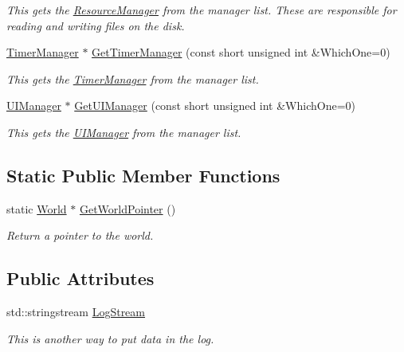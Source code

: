 \begin{DoxyCompactItemize}
\begin{DoxyCompactList}\small\item\em This gets the \hyperlink{classphys_1_1ResourceManager}{ResourceManager} from the manager list. These are responsible for reading and writing files on the disk. \item\end{DoxyCompactList}\item 
\hyperlink{classphys_1_1TimerManager}{TimerManager} $\ast$ \hyperlink{classphys_1_1World_a8e25bc6da5864d303b246224901af852}{GetTimerManager} (const short unsigned int \&WhichOne=0)
\begin{DoxyCompactList}\small\item\em This gets the \hyperlink{classphys_1_1TimerManager}{TimerManager} from the manager list. \item\end{DoxyCompactList}\item 
\hyperlink{classphys_1_1UIManager}{UIManager} $\ast$ \hyperlink{classphys_1_1World_ab7888bf9286df602490c30df6382fde9}{GetUIManager} (const short unsigned int \&WhichOne=0)
\begin{DoxyCompactList}\small\item\em This gets the \hyperlink{classphys_1_1UIManager}{UIManager} from the manager list. \item\end{DoxyCompactList}\end{DoxyCompactItemize}
\subsection*{Static Public Member Functions}
\begin{DoxyCompactItemize}
\item 
static \hyperlink{classphys_1_1World}{World} $\ast$ \hyperlink{classphys_1_1World_ac7b8470a75353497bf8f85a8d3cd24e4}{GetWorldPointer} ()
\begin{DoxyCompactList}\small\item\em Return a pointer to the world. \item\end{DoxyCompactList}\end{DoxyCompactItemize}
\subsection*{Public Attributes}
\begin{DoxyCompactItemize}
\item 
std::stringstream \hyperlink{classphys_1_1World_a6d8b325a077afc924afb70c259ec0299}{LogStream}
\begin{DoxyCompactList}\small\item\em This is another way to put data in the log. \item\end{DoxyCompactList}\end{DoxyCompactItemize}
